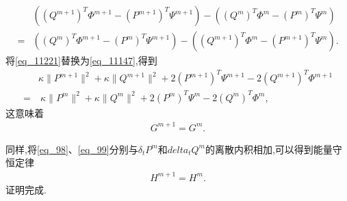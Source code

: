 \begin{pf}
\begin{align}\label{eq_11221}
&((Q^{m+1})^{T}\varPhi^{m+1}-(P^{m+1})^{T}\Psi^{m+1})-((Q^{m})^{T}\varPhi^{m}-(P^{m})^{T}\Psi^{m})\nonumber\\
=&((Q^{m})^{T}\varPhi^{m+1}-(P^{m})^{T}\Psi^{m+1})-((Q^{m+1})^{T}\varPhi^{m}-(P^{m+1})^{T}\Psi^{m}).
\end{align}
将\eqref{eq_11221}替换为\eqref{eq_11147},得到
\begin{align}
&\kappa \|P^{m+1}\|^2+\kappa \|Q^{m+1}\|^2+2(P^{m+1})^{T}\Psi^{m+1}-2(Q^{m+1})^{T}\varPhi^{m+1}\nonumber
\\=&~\kappa \|P^{m}\|^2+\kappa \|Q^{m}\|^2+2(P^{m})^{T}\Psi^{m}-2(Q^{m})^{T}\varPhi^{m},\label{eq_11155}
\end{align}
这意味着
\begin{align}\label{eq_11149}
G^{m+1}=G^{m} .
\end{align}

同样,将\eqref{eq_98}、\eqref{eq_99}分别与$\delta_t P^{m}$和$ delta_t Q^{m}$的离散内积相加,可以得到能量守恒定律
\begin{align}\label{eq_11156}
H^{m+1}=H^{m}.
\end{align}
证明完成.
\end{pf}

